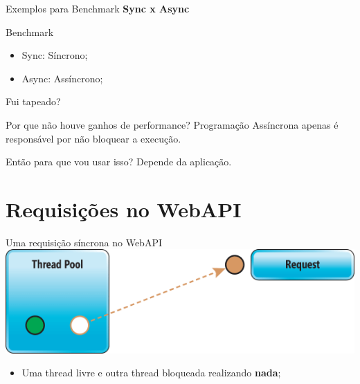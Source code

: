 \documentclass[10pt]{beamer}
\begin{document}
\begin{frame}{Exemplos para Benchmark}
	\textbf{Sync x Async}
\end{frame}

\begin{frame}{Benchmark}
	\begin{figure}
	\end{figure}
	\vspace{-0.5cm}
	\scriptsize
	\begin{itemize}
		\item Sync: Síncrono;
		\item Async: Assíncrono;
	\end{itemize}
\end{frame}

\begin{frame}{Fui tapeado?}
	\begin{alertblock}{Por que não houve ganhos de performance?}
		Programação Assíncrona apenas é responsável por não bloquear a execução.
	\end{alertblock}
	\vspace{0.2cm}
	\begin{exampleblock}{Então para que vou usar isso?}
		Depende da aplicação.
	\end{exampleblock}
\end{frame}

\section{Requisições no WebAPI}

\begin{frame}{Uma requisição síncrona no WebAPI}
	\includegraphics[width=\textwidth]{imgs/sync1}
	\vspace{0.5cm}
	
	\begin{itemize}
		\item Uma thread livre e outra thread bloqueada realizando \textbf{nada};
	\end{itemize}
\end{frame}
\end{document}
